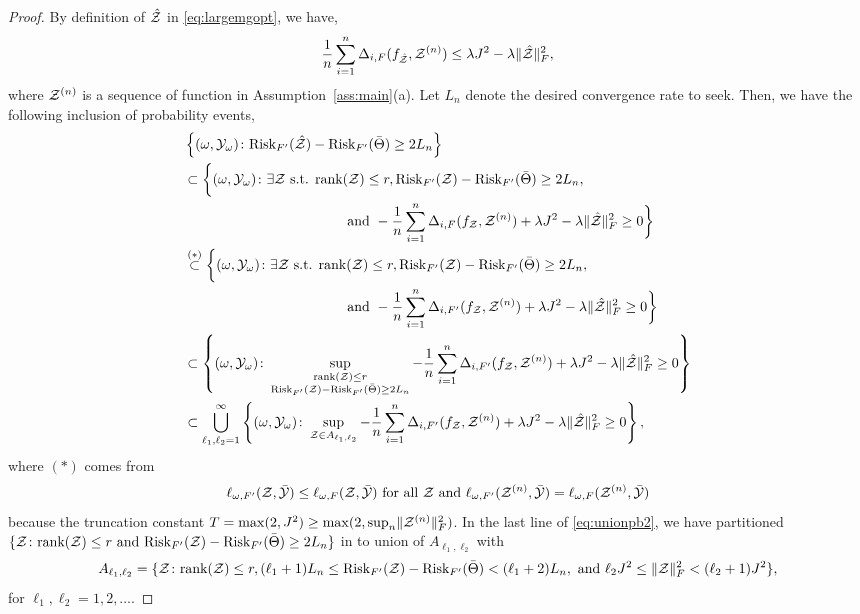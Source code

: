 \documentclass[11pt]{article}
\theoremstyle{plain}
\theoremstyle{definition}
\def\risk{\textup{Risk}}
\begin{document}
\begin{proof}
By definition of $\hat {\mathcal{Z}}$ in \eqref{eq:largemgopt}, we have, 
\[ \frac{1}{n}\sum_{i=1}^n \Delta_{i,F}(f_{\hat {\mathcal{Z}}},\mathcal{Z}^{(n)})\leq \lambda J^2-\lambda\lVert\hat{\mathcal{Z}}\rVert_F^2,\] where $\mathcal{Z}^{(n)}$ is a sequence of function in Assumption~\ref{ass:main}(a).
Let $L_n$ denote the desired convergence rate to seek.  Then, we have the following inclusion of probability events,
\begin{align}\label{eq:unionpb2}
&\left\{(\omega,\tY_{\omega})\colon \risk_{F'}(\hat \tZ)-\risk_{F'}(\bar\Theta)\geq 2L_n \right\}\nonumber\\
&\subset\bigg\{(\omega,\tY_{\omega})\colon\exists \tZ \text{ s.t. } \text{rank}(\tZ)\leq r,  \risk_{F'}(\tZ)-\risk_{F'}(\bar\Theta)\geq2 L_n,\nonumber
\\& \hspace{4cm}\text{ and } -\frac{1}{n}\sum_{i=1}^n\Delta_{i,F}(f_\tZ,\tZ^{(n)})+\lambda J^2-\lambda\FnormSize{}{\hat\tZ}^2\geq 0 \bigg\}\nonumber\\
&\stackrel{(*)}{\subset}\bigg\{(\omega,\tY_{\omega})\colon\exists \tZ \text{ s.t. } \text{rank}(\tZ)\leq r,  \risk_{F'}(\tZ)-\risk_{F'}(\bar\Theta)\geq2 L_n,\nonumber
\\& \hspace{4cm}\text{ and } -\frac{1}{n}\sum_{i=1}^n\Delta_{i,F'}(f_\tZ,\tZ^{(n)})+\lambda J^2-\lambda\FnormSize{}{\hat\tZ}^2\geq 0 \bigg\}\nonumber\\
&\subset \left\{(\omega,\tY_{\omega})\colon\sup_{\substack{\text{rank}(\tZ)\leq r\\  
\risk_{F'}(\tZ)-\risk_{F'}(\bar\Theta)\geq 2L_n  }}-\frac{1}{n}\sum_{i=1}^n\Delta_{i,F'}(f_\tZ,\tZ^{(n)})+\lambda J^2-\lambda\FnormSize{}{\hat\tZ}^2\geq 0\right\}\nonumber\\
&\subset \bigcup_{\ell_1,\ell_2=1}^{\infty}\left\{(\omega,\tY_\omega)\colon \sup_{\tZ\in A_{\ell_1,\ell_2}}-\frac{1}{n}\sum_{i=1}^n\Delta_{i,F'}(f_\tZ,\tZ^{(n)})+\lambda J^2-\lambda\FnormSize{}{\hat\tZ}^2\geq 0\right\},
\end{align}
where  $(*)$ comes from
 \begin{align}
 \ell_{\omega,F'}(\mathcal{Z},\bar{\mathcal{Y}})\leq \ell_{\omega,F}(\mathcal{Z},\bar{\mathcal{Y}}) \text{ for all } \mathcal{Z} \text{ and }   \ell_{\omega,F'}(\mathcal{Z}^{(n)},\bar{\mathcal{Y}})= \ell_{\omega,F}(\mathcal{Z}^{(n)},\bar{\mathcal{Y}}) 
 \end{align}
 because the truncation constant $T = \max(2,J^2)\geq \max(2,\sup_n\lVert\mathcal{Z}^{(n)}\rVert_F^2)$.
In the last line of \eqref{eq:unionpb2}, we have partitioned $\{\tZ\colon \text{rank}(\tZ)\leq r \text{ and } \risk_{F'}(\tZ)-\risk_{F'}(\bar\Theta)\geq 2L_n\}$ in to union of $A_{\ell_1,\ell_2}$ with 
\begin{align}
A_{\ell_1,\ell_2} = \{\tZ\colon \text{rank}(\tZ)\leq r, (\ell_1+1) L_n\leq  \risk_{F'}(\tZ)-\risk_{F'}(\bar\Theta)<(\ell_1+2)L_n,\text{ and } \ell_2J^2\leq \FnormSize{}{\tZ}^2<(\ell_2+1)J^2\},
\end{align}
for $\ell_1,\ell_2 = 1,2,\ldots$. 



\end{proof}
\end{document}
